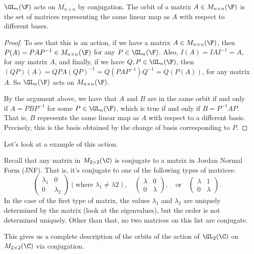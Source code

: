 \documentclass[a4]{scrreprt}
\begin{document}
\begin{proposition}
	$\GL_n(\F)$ acts on $M_{n \times n}$ by conjugation. The orbit of a matrix $A \in M_{n \times n}(\F)$ is the set of matrices representing the same linear map as $A$ with respect to different bases.
\end{proposition}
\begin{proof}
	To see that this is an action, if we have a matrix $A \in M_{n \times n}(\F)$, then $P(A) = PAP^{-1} \in M_{n \times n}(\F)$ for any $P \in \GL_n(\F)$.
	Also, $I(A) = IAI^{-1} = A$, for any matrix $A$, and finally, if we have $Q, P \in \GL_n(\F)$, then $(QP)(A) = QPA (QP)^{-1} = Q(PAP^{-1})Q^{-1} = Q(P(A))$, for any matrix $A$.
	So $\GL_n(\F)$ acts on $M_{n \times n}(\F)$.

	By the argument above, we have that $A$ and $B$ are in the same orbit if and only if $A = PBP^{-1}$ for some $P \in \GL_n(\F)$, which is true if and only if $B = P^{-1}AP$.
	That is, $B$ represents the same linear map as $A$ with respect to a different basis. Precisely, this is the basis obtained by the change of basis corresponding to $P$.
\end{proof}

Let's look at a example of this action.

\begin{example}
Recall that any matrix in $M_{2 \times 2}(\C)$ is conjugate to a matrix in Jordan Normal Form (JNF). That is, it's conjugate to one of the following types of matrices:
$$
\begin{pmatrix}
	\lambda_1 & 0 \\ 0 & \lambda_2
\end{pmatrix} (\text{where }\lambda_1 \neq \lambda 2), \quad \begin{pmatrix}
	\lambda & 0 \\ 0 & \lambda
\end{pmatrix}, \quad \text{or} \quad \begin{pmatrix}
	\lambda & 1 \\ 0 & \lambda
\end{pmatrix}.
$$
In the case of the first type of matrix, the values $\lambda_1$ and $\lambda_2$ are uniquely determined by the matrix (look at the eigenvalues), but the order is not determined uniquely. Other than that, no two matrices on this list are conjugate.

This gives us a complete description of the orbits of the action of $\GL_2(\C)$ on $M_{2 \times 2}(\C)$ via conjugation.
\end{example}
\end{document}
